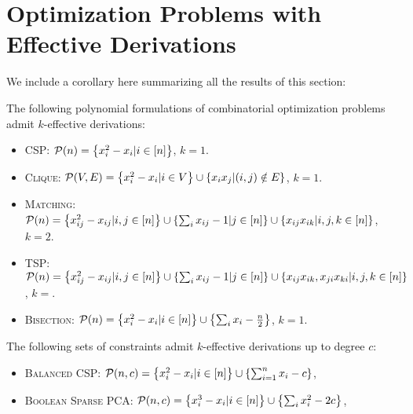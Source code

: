\section{Optimization Problems with Effective Derivations}
We include a corollary here summarizing all the results of this section:
\begin{corollary}\label{cor:effective_list}
The following polynomial formulations of combinatorial optimization problems admit $k$-effective derivations:
\begin{itemize}
\item \textsc{CSP}: $\cP(n) = \csp$, $k = 1$.
\item \textsc{Clique}: $\cP(V,E) = \clique$, $k = 1$.
\item \textsc{Matching}: $\cP(n) = \matching$, $k = 2$.
\item \textsc{TSP}: $\cP(n) = \tsp$, $k = $.
\item \textsc{Bisection}: $\cP(n) = \bisec$, $k = 1$.
\end{itemize}
The following sets of constraints admit $k$-effective derivations up to degree $c$:
\begin{itemize}
\item \textsc{Balanced CSP}: $\cP(n,c) = \bcsp$,
\item \textsc{Boolean Sparse PCA}: $\cP(n,c) = \bspca{n}{2c}$, 
\end{itemize}
\end{corollary}
